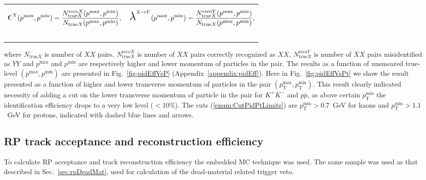 %
\begin{tabulary}{\textwidth}{LL}
\begin{equation}\label{eq:pidEff}
 \mbox{\LARGE$\epsilon$}^{X}(p^{\text{max}}, p^{\text{min}}) = \frac{N^{\text{reco}X}_{\text{true}X}(p^{\text{max}}, p^{\text{min}})}{N_{\text{true}X}(p^{\text{max}}, p^{\text{min}})},
\end{equation}~~~~~~~~~~~~~~~~~~~~~
&
\begin{equation}\label{eq:pMisidProb}
 \mbox{\LARGE$\lambda$}^{X\rightarrow Y}(p^{\text{max}}, p^{\text{min}}) = \frac{N^{\text{reco}Y}_{\text{true}X}(p^{\text{max}}, p^{\text{min}})}{N_{\text{true}X}(p^{\text{max}}, p^{\text{min}})},
\end{equation}~~~~~~~~~~~~~~~~~~~~~
\end{tabulary}
where $N_{\text{true}X}$ is number of $XX$ pairs, $N^{\text{reco}X}_{\text{true}X}$ is number of $XX$ pairs correctly recognized as $XX$, $N^{\text{reco}Y}_{\text{true}X}$ is number of $XX$ pairs misidentified as $YY$ and $p^{\text{max}}$ and $p^{\text{min}}$ are respectively higher and lower momentum of particles in the pair. The results as a function of unsmeared true-level $(p^{\text{max}}, p^{\text{min}})$ are presented in Fig.~\ref{fig:pidEffVsP} (Appendix~\ref{appendix:pidEff}). Here in Fig.~\ref{fig:pidEffVsPt} we show the result presented as a function of higher and lower transverse momentum of particles in the pair $(p_{\text{T}}^{\text{max}}, p_{\text{T}}^{\text{min}})$. This result clearly indicated necessity of adding a cut on the lower transverse momentum of particle in the pair for $K^{+}K^{-}$ and $p\bar{p}$, as above certain $p_{\text{T}}^{\text{min}}$ the identification efficiency drops to a very low level ($<10\%$). The cuts (\ref{enum:CutPidPtLimits}) are $p_{\text{T}}^{\text{min}}>0.7$~GeV for kaons and $p_{\text{T}}^{\text{min}}>1.1$~GeV for protons, indicated with dashed blue lines and arrows.










\subsection{RP track acceptance and reconstruction efficiency}\label{sec:rpAccAndEff}

To calculate RP acceptance and track reconstruction efficiency the embedded MC technique was used. The same sample was used as that described in Sec.~\ref{sec:rpDeadMat}, used for calculation of the dead-material related trigger veto.

